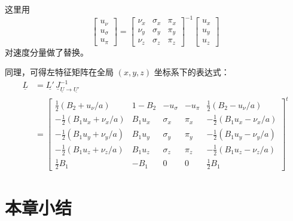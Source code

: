 这里用
\begin{equation}
\begin{bmatrix}u_{\nu}\\
u_{\sigma}\\
u_{\pi}
\end{bmatrix}=\begin{bmatrix}\nu_{x} & \sigma_{x} & \pi_{x}\\
\nu_{y} & \sigma_{y} & \pi_{y}\\
\nu_{z} & \sigma_{z} & \pi_{z}
\end{bmatrix}^{-1}\begin{bmatrix}u_{x}\\
u_{y}\\
u_{z}
\end{bmatrix}
\end{equation}
对速度分量做了替换。

\newpage{}

同理，可得左特征矩阵在全局 $(x,y,z)$ 坐标系下的表达式：
\begin{equation}
\begin{aligned}\underline{L} & =\underline{L'}\,\underline{J}_{\underline{U}\to\underline{U'}}^{-1}\\
 & =\begin{bmatrix}\frac{1}{2}\left(B_{2}+u_{\nu}/a\right) & 1-B_{2} & -u_{\sigma} & -u_{\pi} & \frac{1}{2}\left(B_{2}-u_{\nu}/a\right)\\
-\frac{1}{2}\left(B_{1}u_{x}+\nu_{x}/a\right) & B_{1}u_{x} & \sigma_{x} & \pi_{x} & -\frac{1}{2}\left(B_{1}u_{x}-\nu_{x}/a\right)\\
-\frac{1}{2}\left(B_{1}u_{y}+\nu_{y}/a\right) & B_{1}u_{y} & \sigma_{y} & \pi_{y} & -\frac{1}{2}\left(B_{1}u_{y}-\nu_{y}/a\right)\\
-\frac{1}{2}\left(B_{1}u_{z}+\nu_{z}/a\right) & B_{1}u_{z} & \sigma_{z} & \pi_{z} & -\frac{1}{2}\left(B_{1}u_{z}-\nu_{z}/a\right)\\
\frac{1}{2}B_{1} & -B_{1} & 0 & 0 & \frac{1}{2}B_{1}
\end{bmatrix}^{t}
\end{aligned}
\end{equation}


\section{本章小结}

